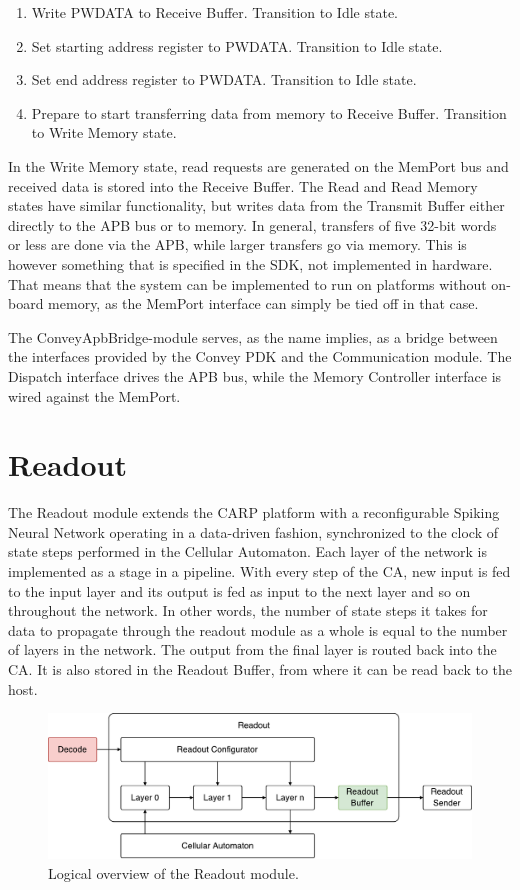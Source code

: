 \begin{enumerate}
\item Write PWDATA to Receive Buffer. Transition to Idle state.
\item Set starting address register to PWDATA. Transition to Idle state.
\item Set end address register to PWDATA. Transition to Idle state.
\item Prepare to start transferring data from memory to Receive Buffer.
  Transition to Write Memory state.
\end{enumerate}

In the Write Memory state, read requests are generated on the MemPort bus and
received data is stored into the Receive Buffer. The Read and Read Memory states
have similar functionality, but writes data from the Transmit Buffer either
directly to the APB bus or to memory. In general, transfers of five 32-bit words
or less are done via the APB, while larger transfers go via memory. This is
however something that is specified in the SDK, not implemented in hardware.
That means that the system can be implemented to run on platforms without
on-board memory, as the MemPort interface can simply be tied off in that case.

The ConveyApbBridge-module serves, as the name implies, as a bridge between the
interfaces provided by the Convey PDK and the Communication module. The Dispatch
interface drives the APB bus, while the Memory Controller interface is wired
against the MemPort.

\section{Readout}
\label{sec:readout}

The Readout module extends the CARP platform with a reconfigurable Spiking
Neural Network operating in a data-driven fashion, synchronized to the clock of
state steps performed in the Cellular Automaton. Each layer of the network is
implemented as a stage in a pipeline. With every step of the CA, new input is
fed to the input layer and its output is fed as input to the next layer and so
on throughout the network. In other words, the number of state steps it takes
for data to propagate through the readout module as a whole is equal to the
number of layers in the network. The output from the final layer is routed back
into the CA. It is also stored in the Readout Buffer, from where it can be read
back to the host.

\begin{figure}[ht]
  \centering
  \includegraphics[width=\linewidth]{fig/readout-io}
  \caption[Readout module]{Logical overview of the Readout module.}
  \label{fig:readout-io}
\end{figure}

